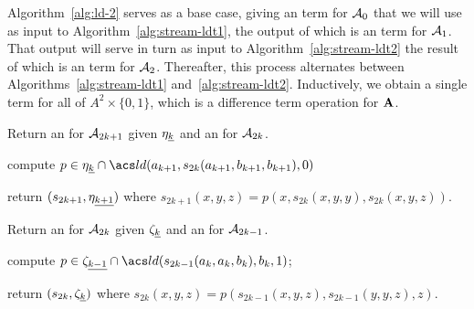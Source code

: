 Algorithm~\ref{alg:ld-2} serves as a base case, giving 
an \ld term for $\mathcal{A}_0$ that we will use as input to Algorithm~\ref{alg:stream-ldt1}, the output of which is 
an \ld term for $\mathcal{A}_1$.
That output will serve in turn as input to 
Algorithm~\ref{alg:stream-ldt2} the result of which is
an \ld term for $\mathcal{A}_2$.  Thereafter, this process alternates between Algorithms~\ref{alg:stream-ldt1} and~\ref{alg:stream-ldt2}.
Inductively, we obtain a single \ld term for all of $A^2 \times \{0,1\}$,
which is a difference term operation for $\mathbf{A}$.

\LinesNumbered
\begin{algorithm}%

  \caption{Return an \ldt for $\mathcal{A}_{2k+1}$ given 
  $\eta_{\underline{k}}$ and an \ldt for $\mathcal{A}_{2k}$.
  \label{alg:stream-ldt1}  }

  compute $p \in \eta_{\kk} \cap \ld (a_{k+1}, s_{2k}(a_{k+1}, b_{k+1}, b_{k+1}), 0)$

  return $(s_{2k+1}, \eta_{\underline{k+1}})$ where 
  $s_{2k+1}(x,y,z) = p(x, s_{2k}(x,y,y), s_{2k}(x,y,z))$.
\end{algorithm}


\LinesNumbered
\begin{algorithm}%

  \caption{Return an \ldt for $\mathcal{A}_{2k}$ given $\zeta_{\underline{k}}$ and 
  an \ldt for $\mathcal{A}_{2k-1}$.
  \label{alg:stream-ldt2}  }

compute $p \in \zeta_{\kminus} \cap \ld (s_{2k-1}(a_k, a_k, b_k), b_k, 1)$;

  return $(s_{2k}, \zeta_{\underline{k}})$ where 
  $s_{2k}(x,y,z) = p(s_{2k-1}(x,y,z), s_{2k-1}(y,y,z),z)$.
\end{algorithm}



























